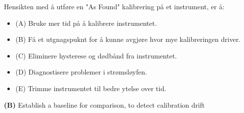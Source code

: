


Hensikten med å utføre en "As Found" kalibrering på et instrument, er å:

\begin{itemize}
\item{(A)} Bruke mer tid på å kalibrere instrumentet. 
\vskip 5pt 
\item{(B)}  Få et utgnagspuknt for å kunne avgjøre hvor mye kalibreringen driver. 
\vskip 5pt 
\item{(C)} Eliminere hysterese og dødbånd fra instrumentet. 
\vskip 5pt 
\item{(D)} Diagnostisere problemer i strømsløyfen.  
\vskip 5pt 
\item{(E)} Trimme instrumentet til bedre ytelse over tid. 
\end{itemize}







{\bf (B)} Establish a baseline for comparison, to detect calibration drift
 











